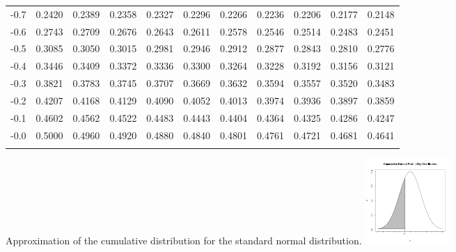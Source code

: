 \begin{tabular}{l|llllllllll}
-0.7 & 0.2420 & 0.2389 & 0.2358 & 0.2327 & 0.2296 & 0.2266 & 0.2236 & 0.2206 & 0.2177 & 0.2148 \\\arrayrulecolor{light-gray}\hline\arrayrulecolor{black} 
-0.6 & 0.2743 & 0.2709 & 0.2676 & 0.2643 & 0.2611 & 0.2578 & 0.2546 & 0.2514 & 0.2483 & 0.2451 \\\arrayrulecolor{light-gray}\hline\arrayrulecolor{black} 
-0.5 & 0.3085 & 0.3050 & 0.3015 & 0.2981 & 0.2946 & 0.2912 & 0.2877 & 0.2843 & 0.2810 & 0.2776 \\\arrayrulecolor{light-gray}\hline\arrayrulecolor{black} 
-0.4 & 0.3446 & 0.3409 & 0.3372 & 0.3336 & 0.3300 & 0.3264 & 0.3228 & 0.3192 & 0.3156 & 0.3121 \\\arrayrulecolor{light-gray}\hline\arrayrulecolor{black} 
-0.3 & 0.3821 & 0.3783 & 0.3745 & 0.3707 & 0.3669 & 0.3632 & 0.3594 & 0.3557 & 0.3520 & 0.3483 \\\arrayrulecolor{light-gray}\hline\arrayrulecolor{black} 
-0.2 & 0.4207 & 0.4168 & 0.4129 & 0.4090 & 0.4052 & 0.4013 & 0.3974 & 0.3936 & 0.3897 & 0.3859 \\\arrayrulecolor{light-gray}\hline\arrayrulecolor{black} 
-0.1 & 0.4602 & 0.4562 & 0.4522 & 0.4483 & 0.4443 & 0.4404 & 0.4364 & 0.4325 & 0.4286 & 0.4247 \\\arrayrulecolor{light-gray}\hline\arrayrulecolor{black} 
-0.0 & 0.5000 & 0.4960 & 0.4920 & 0.4880 & 0.4840 & 0.4801 & 0.4761 & 0.4721 & 0.4681 & 0.4641 \\\arrayrulecolor{light-gray}\hline\arrayrulecolor{black} 
\end{tabular}


\clearpage
 Approximation of the cumulative distribution for the standard normal distribution. 
 \includegraphics[height=3.25cm]{img/cummulativeDist}

